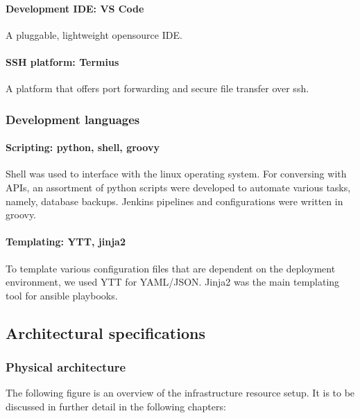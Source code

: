 \paragraph{Development IDE: VS Code }

A pluggable, lightweight opensource IDE. 

\paragraph{SSH platform: Termius }

A platform that offers port forwarding and secure file transfer over ssh. 

\subsubsection{Development languages }

\paragraph{Scripting: python\cite{Python}, shell, groovy\cite{Groovy} }

Shell was used to interface with the linux operating system. For conversing with APIs, an assortment of python scripts were developed to automate various tasks, namely, database backups. Jenkins pipelines and configurations were written in groovy. 

\paragraph{Templating: YTT\cite{YTT}, jinja2\cite{Jinja2} }

To template various configuration files that are dependent on the deployment environment, we used YTT for YAML/JSON. Jinja2 was the main templating tool for ansible playbooks. 

\newpage

\subsection{Architectural specifications}

\subsubsection{Physical architecture}

The following figure is an overview of the infrastructure resource setup. It is to be discussed in further detail in the following chapters:


